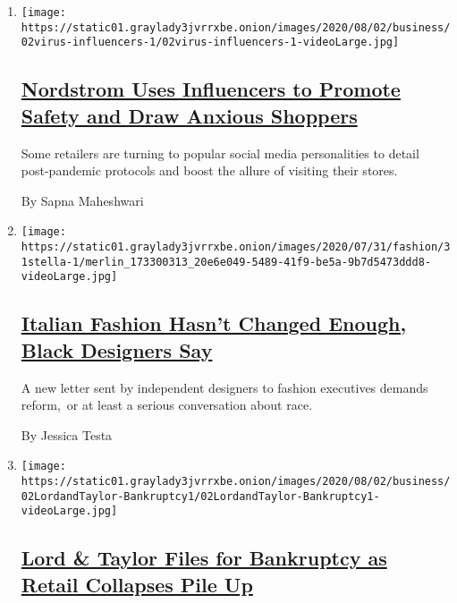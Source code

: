 \begin{enumerate}
\def\labelenumi{\arabic{enumi}.}
\item
  \texttt{[image: https://static01.graylady3jvrrxbe.onion/images/2020/08/02/business/02virus-influencers-1/02virus-influencers-1-videoLarge.jpg]}

  \hypertarget{nordstrom-uses-influencers-to-promote-safety-and-draw-anxious-shoppers}{%
  \subsection{\texorpdfstring{\href{/2020/08/02/business/media/coronavirus-nordstrom-infuencers.html}{Nordstrom
  Uses Influencers to Promote Safety and Draw Anxious
  Shoppers}}{Nordstrom Uses Influencers to Promote Safety and Draw Anxious Shoppers}}\label{nordstrom-uses-influencers-to-promote-safety-and-draw-anxious-shoppers}}

  Some retailers are turning to popular social media personalities to
  detail post-pandemic protocols and boost the allure of visiting their
  stores.

  By Sapna Maheshwari
\item
  \texttt{[image: https://static01.graylady3jvrrxbe.onion/images/2020/07/31/fashion/31stella-1/merlin\_173300313\_20e6e049-5489-41f9-be5a-9b7d5473ddd8-videoLarge.jpg]}

  \hypertarget{italian-fashion-hasnt-changed-enough-black-designers-say}{%
  \subsection{\texorpdfstring{\href{/2020/07/31/fashion/italian-fashion-black-designers.html}{Italian
  Fashion Hasn't Changed Enough, Black Designers
  Say}}{Italian Fashion Hasn't Changed Enough, Black Designers Say}}\label{italian-fashion-hasnt-changed-enough-black-designers-say}}

  A new letter sent by independent designers to fashion executives
  demands reform,~or at least a serious conversation about race.

  By Jessica Testa
\item
  \texttt{[image: https://static01.graylady3jvrrxbe.onion/images/2020/08/02/business/02LordandTaylor-Bankruptcy1/02LordandTaylor-Bankruptcy1-videoLarge.jpg]}

  \hypertarget{lord--taylor-files-for-bankruptcy-as-retail-collapses-pile-up}{%
  \subsection{\texorpdfstring{\href{/2020/08/02/business/Lord-and-Taylor-Bankruptcy.html}{Lord
  \& Taylor Files for Bankruptcy as Retail Collapses Pile
  Up}}{Lord \& Taylor Files for Bankruptcy as Retail Collapses Pile Up}}\label{lord--taylor-files-for-bankruptcy-as-retail-collapses-pile-up}}


\end{enumerate}
